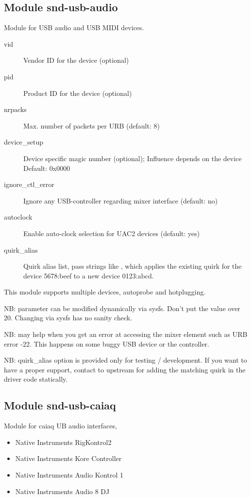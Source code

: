 \documentclass[a4paper,8pt,english]{sphinxmanual}
\begin{document}
\subsection{Module snd-usb-audio}
\label{sound/alsa-configuration:module-snd-usb-audio}
Module for USB audio and USB MIDI devices.
\begin{description}
\item[{vid}] \leavevmode
Vendor ID for the device (optional)

\item[{pid}] \leavevmode
Product ID for the device (optional)

\item[{nrpacks}] \leavevmode
Max. number of packets per URB (default: 8)

\item[{device\_setup}] \leavevmode
Device specific magic number (optional);
Influence depends on the device
Default: 0x0000

\item[{ignore\_ctl\_error}] \leavevmode
Ignore any USB-controller regarding mixer interface (default: no)

\item[{autoclock}] \leavevmode
Enable auto-clock selection for UAC2 devices (default: yes)

\item[{quirk\_alias}] \leavevmode
Quirk alias list, pass strings like , which
applies the existing quirk for the device 5678:beef to a new
device 0123:abcd.

\end{description}

This module supports multiple devices, autoprobe and hotplugging.

NB:  parameter can be modified dynamically via sysfs.
Don't put the value over 20.  Changing via sysfs has no sanity
check.

NB:  may help when you get an error at accessing
the mixer element such as URB error -22.  This happens on some
buggy USB device or the controller.

NB: quirk\_alias option is provided only for testing / development.
If you want to have a proper support, contact to upstream for
adding the matching quirk in the driver code statically.


\subsection{Module snd-usb-caiaq}
\label{sound/alsa-configuration:module-snd-usb-caiaq}
Module for caiaq UB audio interfaces,
\begin{itemize}
\item {} 
Native Instruments RigKontrol2

\item {} 
Native Instruments Kore Controller

\item {} 
Native Instruments Audio Kontrol 1

\item {} 
Native Instruments Audio 8 DJ

\end{itemize}
\end{document}
